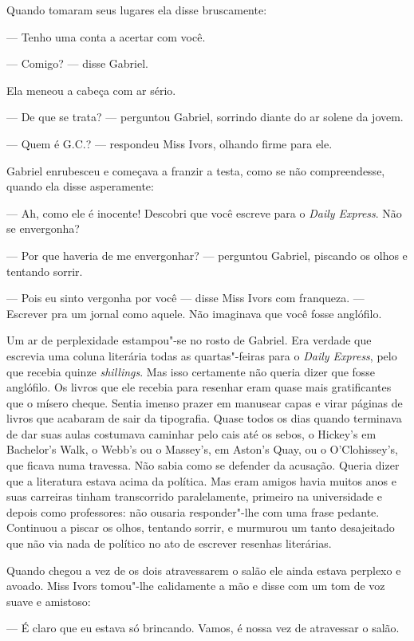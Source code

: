 Quando tomaram seus lugares ela disse bruscamente:

--- Tenho uma conta a acertar com você.

--- Comigo? --- disse Gabriel.

Ela meneou a cabeça com ar sério.

--- De que se trata? --- perguntou Gabriel, sorrindo diante do ar solene da
jovem.

--- Quem é G.C.? --- respondeu Miss Ivors, olhando firme para ele.

Gabriel enrubesceu e começava a franzir a testa, como se não compreendesse,
quando ela disse asperamente:

--- Ah, como ele é inocente!  Descobri que você escreve para o \textit{Daily
Express}.  Não se envergonha?

--- Por que haveria de me envergonhar? --- perguntou Gabriel, piscando os olhos
e tentando sorrir.

--- Pois eu sinto vergonha por você --- disse Miss Ivors com franqueza.  ---
Escrever pra um jornal como aquele.  Não imaginava que você fosse anglófilo.

Um ar de perplexidade estampou"-se no rosto de Gabriel.  Era verdade que
escrevia uma coluna literária todas as quartas"-feiras para o \textit{Daily
Express}, pelo que recebia quinze \textit{shillings}.  Mas isso certamente não
queria dizer que fosse anglófilo.  Os livros que ele recebia para resenhar eram
quase mais gratificantes que o mísero cheque.  Sentia imenso prazer em manusear
capas e virar páginas de livros que acabaram de sair da tipografia.
Quase todos os dias quando terminava de dar suas aulas costumava caminhar pelo
cais até os sebos, o Hickey’s em Bachelor’s Walk, o Webb’s ou o Massey’s, em
Aston’s Quay, ou o O’Clohissey’s, que ficava numa travessa.  Não sabia como se
defender da acusação.  Queria dizer que a literatura estava acima da política.
Mas eram amigos havia muitos anos e suas carreiras tinham transcorrido
paralelamente, primeiro na universidade e depois como professores: não ousaria
responder"-lhe com uma frase pedante.  Continuou a piscar os olhos, tentando
sorrir, e murmurou um tanto desajeitado que não via nada de político no ato de
escrever resenhas literárias.

Quando chegou a vez de os dois atravessarem o salão ele ainda estava perplexo e
avoado.  Miss Ivors tomou"-lhe calidamente a mão e disse com um tom de voz suave
e amistoso:

--- É claro que eu estava só brincando.  Vamos, é nossa vez de atravessar o
salão.

